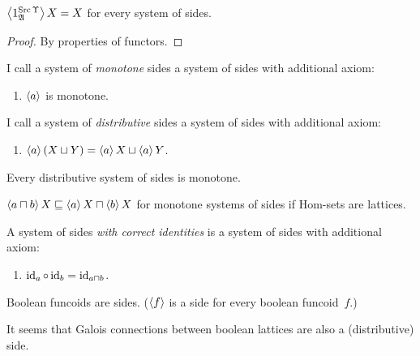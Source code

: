\begin{prop}
$\left\langle 1^{\operatorname{Src}\Upsilon}_\mathfrak{A}\right\rangle X = X$ for every system of sides.
\end{prop}

\begin{proof}
By properties of functors.
\end{proof}

\begin{defn}
I call a system of \emph{monotone} sides a system of sides with additional axiom:
\begin{enumerate}
\item $\left\langle a\right\rangle$ is monotone.
\end{enumerate}
\end{defn}

\begin{defn}
I call a system of \emph{distributive} sides a system of sides with additional axiom:
\begin{enumerate}
\item $\left\langle a\right\rangle(X\sqcup Y) = \left\langle a\right\rangle X\sqcup\left\langle a\right\rangle Y$.
\end{enumerate}
\end{defn}

\begin{obvious}
Every distributive system of sides is monotone.
\end{obvious}

\begin{prop}
$\left\langle a \sqcap b\right\rangle X \sqsubseteq \left\langle a\right\rangle X \sqcap \left\langle b\right\rangle X$ for monotone systems of sides
if Hom-sets are lattices.
\end{prop}

\begin{defn}
A system of sides \emph{with correct identities} is a system of sides with additional axiom:
\begin{enumerate}
\item $\operatorname{id}_a\circ\operatorname{id}_b = \operatorname{id}_{a\sqcap b}$.
\end{enumerate}
\end{defn}

Boolean funcoids  are sides.
($\left\langle f\right\rangle$ is a side for every boolean funcoid~$f$.)

It seems  that Galois connections between boolean lattices 
are also a (distributive) side.


